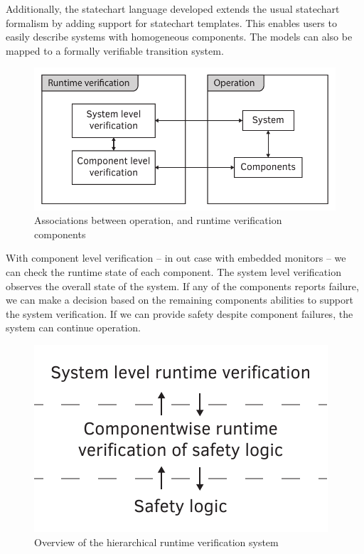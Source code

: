 Additionally, the statechart language developed extends the usual statechart formalism by adding support for statechart templates. This enables users to easily describe systems with homogeneous components. The models can also be mapped to a formally verifiable transition system.

\begin{figure}[H]
	\centering
	\includegraphics[width=0.65\linewidth]{include/figures/chapter_1/rv_overview}
	\caption{Associations between operation, and runtime verification components}
	\label{fig:intro:concept_component}
\end{figure}

With component level verification -- in out case with embedded monitors -- we can check the runtime state of each component. The system level verification observes the overall state of the system. If any of the components reports failure, we can make a decision based on the remaining components abilities to support the system verification. If we can provide safety despite component failures, the system can continue operation.

\begin{figure}[h]
	\centering
	\includegraphics[width=0.4\linewidth]{include/figures/chapter_6/overview_1}
	\caption{Overview of the hierarchical runtime verification system}
	\label{fig:case_study:fov}
\end{figure}